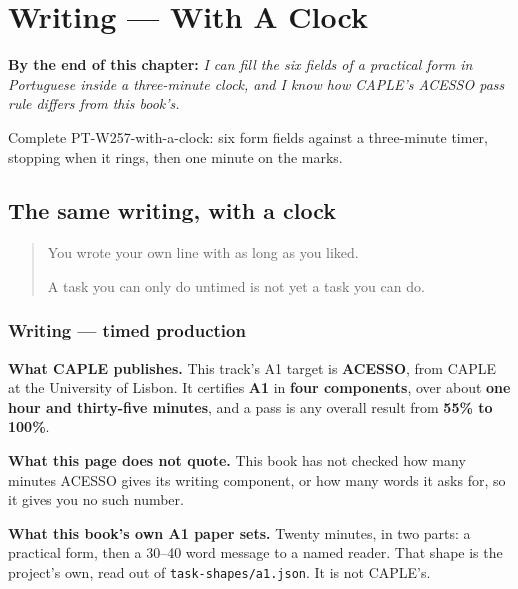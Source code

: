 
\chapter{Writing --- With A Clock}
\label{ch:pt-with-a-clock}

\begin{chapteropening}
\textbf{By the end of this chapter:} \emph{I can fill the six fields of a practical form in Portuguese inside a three-minute clock, and I know how CAPLE's ACESSO pass rule differs from this book's.}

Complete PT-W257-with-a-clock: six form fields against a three-minute timer, stopping when it rings, then one minute on the marks.
\end{chapteropening}

\section[(with a clock)]{The same writing, with a clock}

\label{lesson:PT-W257-with-a-clock}



\begin{quote}
You wrote your own line with as long as you liked.

A task you can only do untimed is not yet a task you can do.
\end{quote}

\subsection*{Writing — timed production}
\textbf{What CAPLE publishes.} This track's A1 target is \textbf{ACESSO}, from CAPLE at the University of Lisbon. It certifies \textbf{A1} in \textbf{four components}, over about \textbf{one hour and thirty-five minutes}, and a pass is any overall result from \textbf{55\% to 100\%}.

\textbf{What this page does not quote.} This book has not checked how many minutes ACESSO gives its writing component, or how many words it asks for, so it gives you no such number.

\textbf{What this book's own A1 paper sets.} Twenty minutes, in two parts: a practical form, then a 30–40 word message to a named reader. That shape is the project's own, read out of \texttt{task-shapes/a1.json}. It is not CAPLE's.

